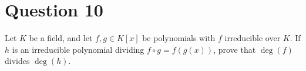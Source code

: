 \section{Question 10}

\begin{question}
    Let $K$ be a field, and let $f, g \in K[x]$ be polynomials with $f$ irreducible over $K$. If $h$ is an irreducible polynomial dividing $f \circ g=f(g(x))$, prove that $\operatorname{deg}(f)$ divides $\operatorname{deg}(h)$.
\end{question}

\begin{answer}
    
\end{answer}